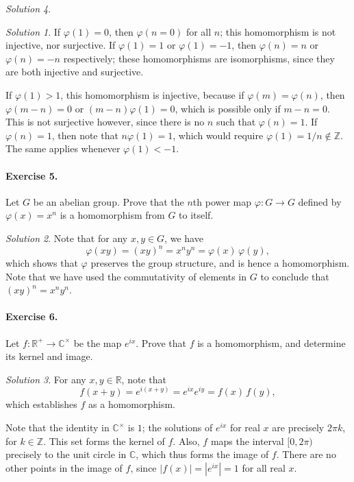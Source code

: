 \documentclass[11pt]{report}
\def\C{\mathbb{C}}
\def\R{\mathbb{R}}
\def\Z{\mathbb{Z}}
\theoremstyle{remark}
\newtheorem*{solution}{Solution}
\begin{document}
\begin{solution}
\begin{solution}
        If $\varphi(1) = 0$, then $\varphi(n = 0)$ for all $n$; this homomorphism is
        not injective, nor surjective. If $\varphi(1) = 1$ or $\varphi(1) = -1$,
        then $\varphi(n) = n$ or $\varphi(n) = -n$ respectively; these homomorphisms
        are isomorphisms, since they are both injective and surjective.

        If $\varphi(1) > 1$, this homomorphism is injective, because if $\varphi(m)
        = \varphi(n)$, then $\varphi(m - n) = 0$ or $(m - n)\varphi(1) = 0$, which
        is possible only if $m - n = 0$. This is not surjective however, since there
        is no $n$ such that $\varphi(n) = 1$. If $\varphi(n) = 1$, then note that
        $n\varphi(1) = 1$, which would require $\varphi(1) = 1 / n \notin \Z$. The
        same applies whenever $\varphi(1) < -1$.
    \end{solution}

    \paragraph{Exercise 5.} Let $G$ be an abelian group. Prove that the $n$th power
    map $\varphi\colon G \to G$ defined by $\varphi(x) = x^n$ is a homomorphism from
    $G$ to itself.
    \begin{solution}
        Note that for any $x, y \in G$, we have \[
            \varphi(xy) = (xy)^n = x^ny^n = \varphi(x)\, \varphi(y),
        \] which shows that $\varphi$ preserves the group structure, and is hence a
        homomorphism. Note that we have used the commutativity of elements in $G$ to
        conclude that $(xy)^n = x^ny^n$.
    \end{solution}

    \paragraph{Exercise 6.} Let $f\colon \R^+ \to \C^\times$ be the map $e^{ix}$.
    Prove that $f$ is a homomorphism, and determine its kernel and image.
    \begin{solution}
        For any $x, y \in \R$, note that \[
            f(x + y) = e^{i(x + y)} = e^{ix}e^{iy} = f(x)\,f(y),
        \] which establishes $f$ as a homomorphism.

        Note that the identity in $\C^\times$ is $1$; the solutions of $e^{ix}$ for
        real $x$ are precisely $2\pi k$, for $k \in \Z$. This set forms the kernel
        of $f$. Also, $f$ maps the interval $[0, 2\pi)$ precisely to the unit circle
        in $\C$, which thus forms the image of $f$.  There are no other points in
        the image of $f$, since $|f(x)| = |e^{ix}| = 1$ for all real $x$.
    \end{solution}
    

\end{solution}
\end{document}
